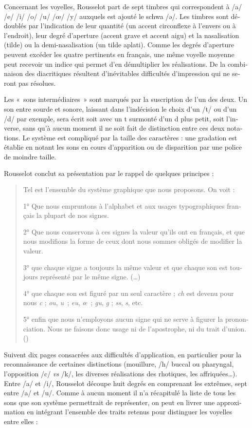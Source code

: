 \documentclass[french,output=paper,colorlinks,citecolor=brown]{../langscibook}
\begin{document}
\begin{otherlanguage}{french}
Concernant les voyelles, Rousselot part de sept timbres qui correspondent à /a/ /e/ /i/ /o/ /u/ /œ/ /y/ auxquels est ajouté le schwa /\textlatin{ə}/. Les timbres sont dédoublés par l’indication de leur quantité (un accent circonflexe à l’envers ou à l’endroit), leur degré d’aperture (accent grave et accent aigu) et la nasalisation (tilde) ou la demi-nasalisation (un tilde aplati). Comme les degrés d’aperture peuvent excéder les quatre pertinents en français, une même voyelle moyenne peut recevoir un indice qui permet d’en démultiplier les réalisations. De la combinaison des diacritiques résultent d’inévitables difficultés d’impression qui ne seront pas résolues.

Les «~sons intermédiaires~» sont marqués par la suscription de l’un des deux. Un son entre sourde et sonore, laissant dans l’indécision le choix d’un /t/ ou d’un /d/ par exemple, sera écrit soit avec un t surmonté d’un d plus petit, soit l’inverse, sans qu’à aucun moment il ne soit fait de distinction entre ces deux notations. Le système est compliqué par la taille des caractères : une gradation est établie en notant les sons en cours d’apparition ou de disparition par une police de moindre taille.

Rousselot conclut sa présentation par le rappel de quelques principes :

\begin{quote}
    Tel est l’ensemble du système graphique que nous proposons. On voit :

    1° Que nous empruntons à l’alphabet et aux usages typographiques français la plupart de nos signes.

    2° Que nous conservons à ces signes la valeur qu’ils ont en français, et que nous modifions la forme de ceux dont nous sommes obligés de modifier la valeur.

    3° que chaque signe a toujours la même valeur et que chaque son est toujours représenté par le même signe. (…)

    4° que chaque son est figuré par un seul caractère ; \textit{ch} est devenu pour nous \textit{c} ; \textit{ou}, \textit{u~}; \textit{eu}, \textit{œ~}; \textit{gu}, \textit{g} ; \textit{ss}, \textit{s}, etc.

    5° enfin que nous n’employons aucun signe qui ne serve à figurer la prononciation. Nous ne faisons donc usage ni de l’apostrophe, ni du trait d’union. (\citealt[6--7]{Rousselot1887})
\end{quote}

Suivent dix pages consacrées aux difficultés d’application, en particulier pour la reconnaissance de certaines distinctions (mouillure, /h/ buccal ou pharyngal, l’opposition /c/ \textit{vs} /k/, les diverses réalisations des rhotiques, les affriquées…). Entre /a/ et /i/, Rousselot découpe huit degrés en comprenant les extrêmes, sept entre /a/ et /u/. Comme à aucun moment il n’a récapitulé la liste de tous les sons que son système permettrait de représenter, on peut en livrer une approximation en intégrant l’ensemble des traits retenus pour distinguer les voyelles entre elles :


\end{otherlanguage}
\end{document}
